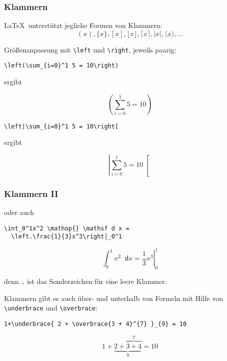 \begin{frame}[fragile]
  \frametitle{Klammern}

  \onslide<+->

  \LaTeX\ unterstützt jegliche Formen von Klammern:
  \begin{equation*}
    (x), \{x\},[x],\lfloor x\rfloor, \lceil x\rceil,|x|,\langle x \rangle,\ldots
  \end{equation*}

  \onslide<+->

  Größenanpassung mit \lstinline{\left} und \lstinline{\right}, jeweils paarig:

\begin{lstlisting}
\left(\sum_{i=0}^1 5 = 10\right)
\end{lstlisting}

  ergibt
  \vspace*{-3ex}

  \begin{equation*}
    \left(\sum_{i=0}^1 5 = 10\right)
  \end{equation*}

  \vspace*{1ex}

  \onslide<+->

\begin{lstlisting}
\left|\sum_{i=0}^1 5 = 10\right[
\end{lstlisting}

  ergibt
  \vspace*{-3ex}

  \begin{equation*}
    \left|\sum_{i=0}^1 5 = 10\right[
  \end{equation*}

\end{frame}

\begin{frame}[fragile]
  \frametitle{Klammern II}

  \onslide<+->

  oder auch

\begin{lstlisting}
\int_0^1x^2 \mathop{} \mathsf d x =
  \left.\frac{1}{3}x^3\right|_0^1
\end{lstlisting}
  \begin{equation*}
    \int_0^1x^2 \mathop{} \mathsf d x = \left.\frac{1}{3}x^3\right|_0^1
  \end{equation*}

  denn \verb|.| ist das Sonderzeichen für eine leere Klammer.

  \onslide<+->
  \medskip

  Klammern gibt es auch über- und unterhalb von Formeln mit Hilfe von
  \lstinline{\underbrace} und \lstinline{\overbrace}:
\begin{lstlisting}
1+\underbrace{ 2 + \overbrace{3 + 4}^{7} }_{9} = 10
\end{lstlisting}
  \begin{equation*}
    1+\underbrace{ 2 + \overbrace{3 + 4}^{7} }_{9} = 10
  \end{equation*}

\end{frame}


